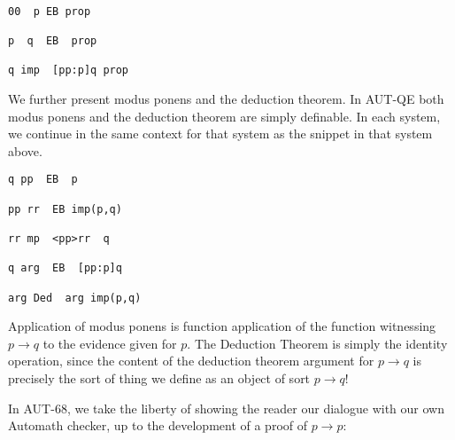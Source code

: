 \documentclass{article}
\begin{document}
   \begin{verbatim}

00  p EB prop

p  q  EB  prop

q imp  [pp:p]q prop

\end{verbatim}



We further present modus ponens and the deduction theorem. In AUT-QE
both modus ponens and the deduction theorem are simply definable.  In each system, we continue
in the same context for that system as the snippet in that system above.

   \begin{verbatim}
q pp  EB  p

pp rr  EB imp(p,q)

rr mp  <pp>rr  q

q arg  EB  [pp:p]q

arg Ded  arg imp(p,q)
\end{verbatim}

Application of modus ponens is function application of the function witnessing $p \rightarrow q$ to the evidence given for $p$.  The Deduction Theorem is simply the identity operation, since the content of the deduction theorem argument for $p \rightarrow q$ is precisely the sort of thing we define as an object of sort $p \rightarrow q$!

In AUT-68, we take the liberty of showing the reader our dialogue with our own Automath checker, up to the development of a proof of $p\rightarrow p$:
\end{document}
